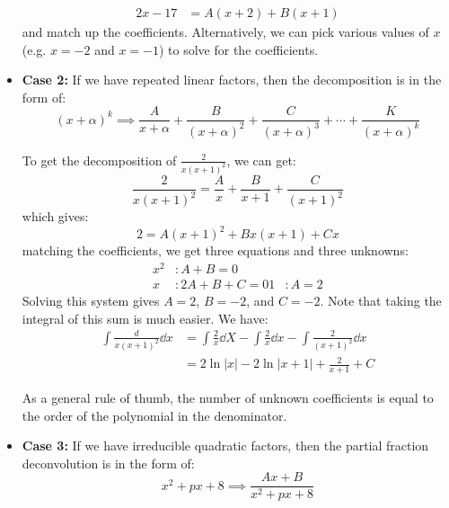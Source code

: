 \begin{itemize}
\begin{example}
\begin{align}
            2x-17 &= A(x+2) + B(x+1)
        \end{align}
        and match up the coefficients. Alternatively, we can pick various values of $x$ (e.g. $x=-2$ and $x=-1$) to solve for the coefficients.
    \end{example}
    \item \textbf{Case 2:} If we have repeated linear factors, then the decomposition is in the form of:
    \begin{equation}
        (x+\alpha)^k \implies \frac{A}{x+\alpha} + \frac{B}{(x+\alpha)^2} + \frac{C}{(x+\alpha)^3} + \cdots + \frac{K}{(x+\alpha)^k}
    \end{equation}
    \begin{example}
        To get the decomposition of $\frac{2}{x(x+1)^2}$, we can get:
        \begin{equation}
            \frac{2}{x(x+1)^2} = \frac{A}{x} + \frac{B}{x+1} + \frac{C}{(x+1)^2}
        \end{equation}
        which gives:
        \begin{equation}
            2 = A(x+1)^2 + Bx(x+1) + Cx
        \end{equation}
        matching the coefficients, we get three equations and three unknowns:
        \begin{align}
            x^2 &: A + B = 0 \\ 
            x &: 2A+B+C = 0
            1 &: A = 2
        \end{align}
        Solving this system gives $A=2$, $B=-2$, and $C=-2$. Note that taking the integral of this sum is much easier. We have:
        \begin{align}
            \int \frac{d}{x(x+1)^2} \dd{x} &= \int \frac{2}{x} \dd{X} - \int \frac{2}{x} \dd{x} - \int \frac{2}{(x+1)^2} \dd{x} \\ 
            &= 2\ln|x| - 2\ln|x+1| + \frac{2}{x+1} + C
        \end{align}
    \end{example}
    \begin{idea}
        As a general rule of thumb, the number of unknown coefficients is equal to the order of the polynomial in the denominator.
    \end{idea}
    \item \textbf{Case 3:} If we have irreducible quadratic factors, then the partial fraction deconvolution is in the form of:
    \begin{equation}
        x^2+px+8 \implies \frac{Ax+B}{x^2+px+8}

\end{equation}
\end{itemize}
